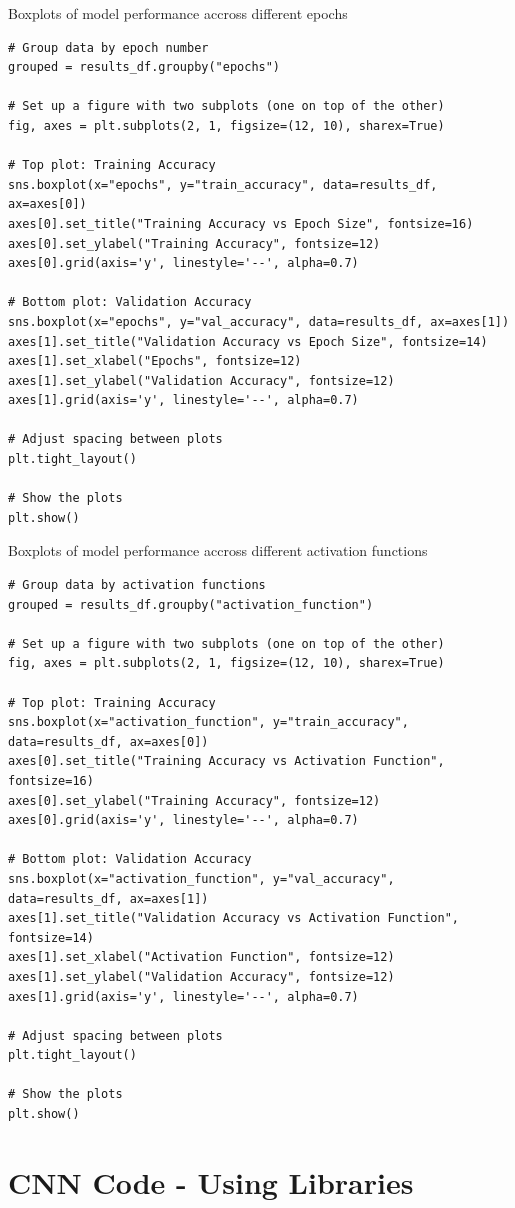 \documentclass[a4paper]{article}
\begin{document}
Boxplots of model performance accross different epochs
\begin{lstlisting}
# Group data by epoch number
grouped = results_df.groupby("epochs")

# Set up a figure with two subplots (one on top of the other)
fig, axes = plt.subplots(2, 1, figsize=(12, 10), sharex=True)

# Top plot: Training Accuracy
sns.boxplot(x="epochs", y="train_accuracy", data=results_df, ax=axes[0])
axes[0].set_title("Training Accuracy vs Epoch Size", fontsize=16)
axes[0].set_ylabel("Training Accuracy", fontsize=12)
axes[0].grid(axis='y', linestyle='--', alpha=0.7)

# Bottom plot: Validation Accuracy
sns.boxplot(x="epochs", y="val_accuracy", data=results_df, ax=axes[1])
axes[1].set_title("Validation Accuracy vs Epoch Size", fontsize=14)
axes[1].set_xlabel("Epochs", fontsize=12)
axes[1].set_ylabel("Validation Accuracy", fontsize=12)
axes[1].grid(axis='y', linestyle='--', alpha=0.7)

# Adjust spacing between plots
plt.tight_layout()

# Show the plots
plt.show()
\end{lstlisting}


Boxplots of model performance accross different activation functions
\begin{lstlisting}
# Group data by activation functions
grouped = results_df.groupby("activation_function")

# Set up a figure with two subplots (one on top of the other)
fig, axes = plt.subplots(2, 1, figsize=(12, 10), sharex=True)

# Top plot: Training Accuracy
sns.boxplot(x="activation_function", y="train_accuracy", data=results_df, ax=axes[0])
axes[0].set_title("Training Accuracy vs Activation Function", fontsize=16)
axes[0].set_ylabel("Training Accuracy", fontsize=12)
axes[0].grid(axis='y', linestyle='--', alpha=0.7)

# Bottom plot: Validation Accuracy
sns.boxplot(x="activation_function", y="val_accuracy", data=results_df, ax=axes[1])
axes[1].set_title("Validation Accuracy vs Activation Function", fontsize=14)
axes[1].set_xlabel("Activation Function", fontsize=12)
axes[1].set_ylabel("Validation Accuracy", fontsize=12)
axes[1].grid(axis='y', linestyle='--', alpha=0.7)

# Adjust spacing between plots
plt.tight_layout()

# Show the plots
plt.show()
\end{lstlisting}

\newpage
\section{CNN Code - Using Libraries}
\end{document}
